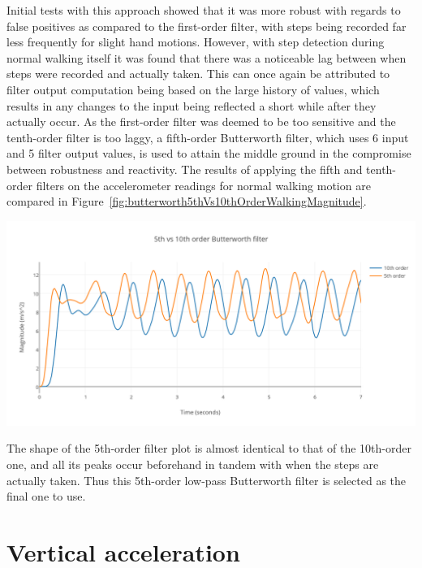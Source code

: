 \documentclass[12pt,a4paper,notitlepage]{report}
\begin{document}
Initial tests with this approach showed that it was more robust with regards to false positives as compared to the first-order filter, with steps being recorded far less frequently for slight hand motions. However, with step detection during normal walking itself it was found that there was a noticeable lag between when steps were recorded and actually taken. This can once again be attributed to filter output computation being based on the large history of values, which results in any changes to the input being reflected a short while after they actually occur. As the first-order filter was deemed to be too sensitive and the tenth-order filter is too laggy, a fifth-order Butterworth filter, which uses 6 input and 5 filter output values, is used to attain the middle ground in the compromise between robustness and reactivity. The results of applying the fifth and tenth-order filters on the accelerometer readings for normal walking motion are compared in Figure~\ref{fig:butterworth5thVs10thOrderWalkingMagnitude}.  

\begin{center}
\includegraphics[scale=0.9]{images/butterworth5thVs10thOrderWalkingMagnitude.png}
\label{fig:butterworth5thVs10thOrderWalkingMagnitude}
\end{center}

The shape of the 5th-order filter plot is almost identical to that of the 10th-order one, and all its peaks occur beforehand in tandem with when the steps are actually taken. Thus this 5th-order low-pass Butterworth filter is selected as the final one to use. 

\section*{Vertical acceleration}
\end{document}
